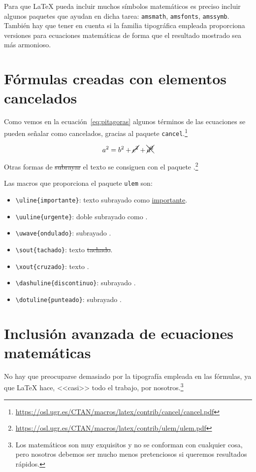 \documentclass[11pt,a4paper]{article}
\begin{document}
Para que \LaTeX{} pueda incluir muchos símbolos matemáticos es preciso incluir algunos paquetes que ayudan en dicha tarea: \texttt{amsmath}, \texttt{amsfonts}, \texttt{amssymb}. También hay que tener en cuenta si la familia tipográfica empleada proporciona versiones para ecuaciones matemáticas de forma que el resultado mostrado sea más armonioso. 







\section{Fórmulas creadas con elementos cancelados}
Como vemos en la ecuación~\ref{eq:pitagoras} algunos términos de las ecuaciones se pueden señalar como cancelados, gracias al paquete \texttt{cancel}.\footnote{\url{https://osl.ugr.es/CTAN/macros/latex/contrib/cancel/cancel.pdf}}

\begin{equation} \label{eq:pitagoras}
	a^{2}=b^{2} + \cancel{c^{2}}+ \xcancel{d^{2}}
\end{equation}

\noindent Otras formas de \sout{subrayar} el texto se consiguen con el paquete .\footnote{\url{https://osl.ugr.es/CTAN/macros/latex/contrib/ulem/ulem.pdf}}

\noindent Las macros que proporciona el paquete \texttt{ulem} son:
\begin{itemize}[noitemsep]
	\item \verb|\uline{importante}|: texto subrayado como \uline{importante}.
	\item \verb||: doble subrayado como \uuline{urgente}.
	\item \verb||: subrayado \uwave{ondulado}.
	\item \verb|\sout{tachado}|: texto \sout{tachado}.
	\item \verb||: texto \xout{cruzado}.
	\item \verb||: subrayado \dashuline{discontinuo}.
	\item \verb||: subrayado \dotuline{punteado}.
\end{itemize}



\section{Inclusión avanzada de ecuaciones matemáticas}
No hay que preocuparse demasiado por la tipografía empleada en las fórmulas, ya que \LaTeX{} hace, <<casi>> todo el trabajo, por nosotros.\footnote{Los matemáticos son muy exquisitos y no se conforman con cualquier cosa, pero nosotros debemos ser mucho menos pretenciosos si queremos resultados rápidos.}
\end{document}
